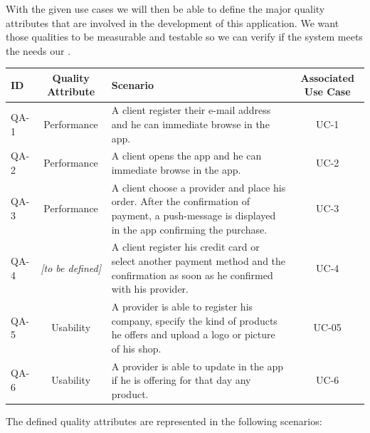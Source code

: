 With the given use cases we will then be able to define the major quality attributes that are involved in the 
development of this application. We want those qualities to be measurable and testable so we can verify if the 
system meets the needs our  \cite{refbook:DSHC}.

\begin{table}[H]
    \begin{tabularx}{\textwidth}{lcXc}
        \toprule
        ID & Quality Attribute & Scenario & Associated Use Case  \\
        \midrule
        QA-1 & Performance & A \gls{client} register their e-mail address and he can immediate browse in the app. & UC-1 \\
        QA-2 & Performance & A \gls{client} opens the app and he can immediate browse in the app. & UC-2 \\
        QA-3 & Performance & A \gls{client} choose a \gls{provider} and place his order. After the confirmation
        of payment, a push-message is displayed in the app confirming the purchase. & UC-3 \\
        QA-4 & \textit{[to be defined]} & A \gls{client}  register his credit card or select another payment method and the
        confirmation as soon as he confirmed with his \gls{provider}. & UC-4 \\
        QA-5 & Usability & A \gls{provider} is able to register his company, specify the kind of products he offers and upload
        a logo or picture of his shop. & UC-05 \\
        QA-6 & Usability & A \gls{provider} is able to update in the app if he is offering for that day any product. &  UC-6 \\
        \bottomrule
    \end{tabularx}
\end{table}

\newpage
The defined quality attributes are represented in the following scenarios:

